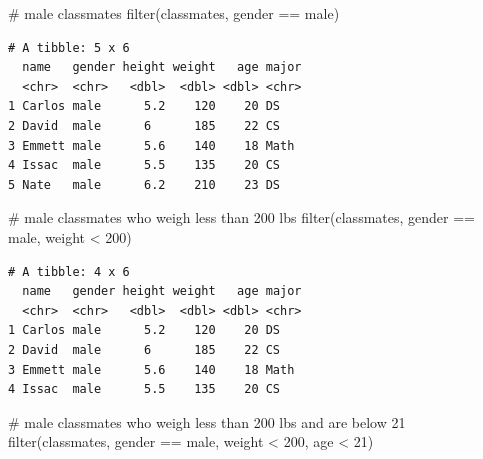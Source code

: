 \documentclass[
  letterpaper,
  DIV=11,
  numbers=noendperiod]{scrreprt}
\newenvironment{Shaded}{\begin{snugshade}}{\end{snugshade}}
\newcommand{\CommentTok}[1]{\textcolor[rgb]{0.37,0.37,0.37}{#1}}
\newcommand{\DecValTok}[1]{\textcolor[rgb]{0.68,0.00,0.00}{#1}}
\newcommand{\FunctionTok}[1]{\textcolor[rgb]{0.28,0.35,0.67}{#1}}
\newcommand{\NormalTok}[1]{\textcolor[rgb]{0.00,0.23,0.31}{#1}}
\newcommand{\SpecialCharTok}[1]{\textcolor[rgb]{0.37,0.37,0.37}{#1}}
\newcommand{\StringTok}[1]{\textcolor[rgb]{0.13,0.47,0.30}{#1}}
\begin{document}
\begin{tcolorbox}[enhanced jigsaw, colbacktitle=quarto-callout-tip-color!10!white, opacitybacktitle=0.6, breakable, left=2mm, leftrule=.75mm, toprule=.15mm, toptitle=1mm, bottomtitle=1mm, colframe=quarto-callout-tip-color-frame, opacityback=0, coltitle=black, arc=.35mm, titlerule=0mm, colback=white, bottomrule=.15mm, title=\textcolor{quarto-callout-tip-color}{\faLightbulb}\hspace{0.5em}{Answer}, rightrule=.15mm]

\begin{Shaded}
\begin{Highlighting}[]
\CommentTok{\# male classmates}
\FunctionTok{filter}\NormalTok{(classmates, gender }\SpecialCharTok{==} \StringTok{\textquotesingle{}male\textquotesingle{}}\NormalTok{)}
\end{Highlighting}
\end{Shaded}

\begin{verbatim}
# A tibble: 5 x 6
  name   gender height weight   age major
  <chr>  <chr>   <dbl>  <dbl> <dbl> <chr>
1 Carlos male      5.2    120    20 DS   
2 David  male      6      185    22 CS   
3 Emmett male      5.6    140    18 Math 
4 Issac  male      5.5    135    20 CS   
5 Nate   male      6.2    210    23 DS   
\end{verbatim}

\begin{Shaded}
\begin{Highlighting}[]
\CommentTok{\# male classmates who weigh less than 200 lbs}
\FunctionTok{filter}\NormalTok{(classmates, gender }\SpecialCharTok{==} \StringTok{\textquotesingle{}male\textquotesingle{}}\NormalTok{, weight }\SpecialCharTok{\textless{}} \DecValTok{200}\NormalTok{)}
\end{Highlighting}
\end{Shaded}

\begin{verbatim}
# A tibble: 4 x 6
  name   gender height weight   age major
  <chr>  <chr>   <dbl>  <dbl> <dbl> <chr>
1 Carlos male      5.2    120    20 DS   
2 David  male      6      185    22 CS   
3 Emmett male      5.6    140    18 Math 
4 Issac  male      5.5    135    20 CS   
\end{verbatim}

\begin{Shaded}
\begin{Highlighting}[]
\CommentTok{\# male classmates who weigh less than 200 lbs and are below 21}
\FunctionTok{filter}\NormalTok{(classmates, gender }\SpecialCharTok{==} \StringTok{\textquotesingle{}male\textquotesingle{}}\NormalTok{, weight }\SpecialCharTok{\textless{}} \DecValTok{200}\NormalTok{, age }\SpecialCharTok{\textless{}} \DecValTok{21}\NormalTok{)}
\end{Highlighting}
\end{Shaded}


\end{tcolorbox}
\end{document}
